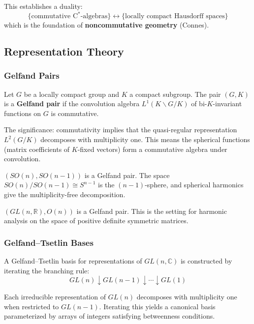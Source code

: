 This establishes a duality:
\[
\{\text{commutative C}^*\text{-algebras}\} \longleftrightarrow \{\text{locally compact Hausdorff spaces}\}
\]
which is the foundation of \textbf{noncommutative geometry} (Connes).

\subsection{Representation Theory}

\subsubsection{Gelfand Pairs}

\begin{definition}
Let $G$ be a locally compact group and $K$ a compact subgroup. The pair $(G,K)$ is a \textbf{Gelfand pair} if the convolution algebra $L^1(K\backslash G/K)$ of bi-$K$-invariant functions on $G$ is commutative.
\end{definition}

The significance: commutativity implies that the quasi-regular representation $L^2(G/K)$ decomposes with multiplicity one. This means the spherical functions (matrix coefficients of $K$-fixed vectors) form a commutative algebra under convolution.

\begin{example}
$(SO(n), SO(n-1))$ is a Gelfand pair. The space $SO(n)/SO(n-1) \cong S^{n-1}$ is the $(n-1)$-sphere, and spherical harmonics give the multiplicity-free decomposition.
\end{example}

\begin{example}
$(GL(n,\mathbb{R}), O(n))$ is a Gelfand pair. This is the setting for harmonic analysis on the space of positive definite symmetric matrices.
\end{example}

\subsubsection{Gelfand--Tsetlin Bases}

A Gelfand--Tsetlin basis for representations of $GL(n,\mathbb{C})$ is constructed by iterating the branching rule:
\[
GL(n) \downarrow GL(n-1) \downarrow \cdots \downarrow GL(1)
\]

Each irreducible representation of $GL(n)$ decomposes with multiplicity one when restricted to $GL(n-1)$. Iterating this yields a canonical basis parameterized by arrays of integers satisfying betweenness conditions.

